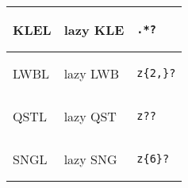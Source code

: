 \begin{xtabular}{lll}
\midrule
KLEL & lazy KLE &
\begin{minipage}{0.5in}\begin{verbatim}
.*?
\end{verbatim}\end{minipage} \\
\midrule
LWBL & lazy LWB &
\begin{minipage}{0.5in}\begin{verbatim}
z{2,}?
\end{verbatim}\end{minipage} \\
\midrule
QSTL & lazy QST &
\begin{minipage}{0.5in}\begin{verbatim}
z??
\end{verbatim}\end{minipage} \\
\midrule
SNGL & lazy SNG &
\begin{minipage}{0.5in}\begin{verbatim}
z{6}?
\end{verbatim}\end{minipage} \\
\end{xtabular}





